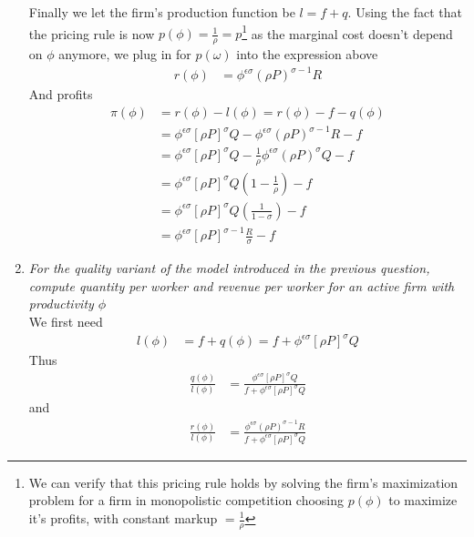 \documentclass[10pt, final]{article}
\begin{document}
\begin{enumerate}[1.]
Finally we let the firm's production function be $l = f+q$.
Using the fact that the pricing rule is now $p(\phi) = \frac{1}{\rho} = p$\footnote{We can verify that this pricing rule holds by solving the firm's maximization problem for a firm in monopolistic competition choosing $p(\phi)$ to maximize it's profits, with constant markup $= \frac{1}{\rho}$} as the marginal cost doesn't depend on $\phi$ anymore, we plug in for $p(\omega)$ into the expression above
\begin{align*}
	r(\phi) &= \phi^{\epsilon \sigma}(\rho P)^{\sigma-1}R
\end{align*}
And profits
\begin{align*}
	\pi(\phi) &= r(\phi) - l(\phi) = r(\phi) - f - q(\phi) \\
	&= \phi^{\epsilon \sigma} [\rho P]^{\sigma} Q - \phi^{\epsilon \sigma}(\rho P)^{\sigma-1}R - f \\
	&= \phi^{\epsilon \sigma} [\rho P]^{\sigma} Q - \frac{1}{\rho}\phi^{\epsilon \sigma}(\rho P)^{\sigma}Q - f \\
	&= \phi^{\epsilon \sigma} [\rho P]^{\sigma} Q (1 - \frac{1}{\rho}) -  f \\
	&= \phi^{\epsilon \sigma} [\rho P]^{\sigma} Q (\frac{1}{1-\sigma}) - f \\
	&= \phi^{\epsilon \sigma} [\rho P]^{\sigma-1} \frac{R}{\sigma}  - f
\end{align*}




	\item \textit{For the quality variant of the model introduced in the previous question, compute quantity per worker and revenue per worker for an active firm with productivity $\phi$}
	\\
	We first need 
	\begin{align*}
		l(\phi) &= f + q(\phi) = f + \phi^{\epsilon \sigma} [\rho P]^{\sigma} Q
	\end{align*}
	Thus
	\begin{align*}
		\frac{q(\phi)}{l(\phi)} &= \frac{\phi^{\epsilon \sigma} [\rho P]^{\sigma} Q}{f + \phi^{\epsilon \sigma} [\rho P]^{\sigma} Q}
	\end{align*}
	and
	\begin{align*}
		\frac{r(\phi)}{l(\phi)} &= \frac{\phi^{\epsilon \sigma}(\rho P)^{\sigma-1}R}{f + \phi^{\epsilon \sigma} [\rho P]^{\sigma} Q}
	\end{align*}




\end{enumerate}
\end{document}
